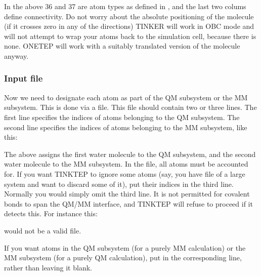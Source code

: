 \documentclass[letterpaper,10pt,english]{sphinxmanual}
\begin{document}
In the above 36 and 37 are atom types as defined in ,
and the last two colums define connectivity. Do not worry about the
absolute positioning of the molecule (if it crosses zero in any of the
directions) \textendash{} TINKER will work in OBC mode and will not attempt to wrap
your atoms back to the simulation cell, because there is none. ONETEP
will work with a suitably translated version of the molecule anyway.


\subsubsection{Input  file}
\label{\detokenize{tinktep:input-tag-file}}
Now we need to designate each atom as part of the QM subsystem or the MM
subsystem. This is done via a  file. This file should contain
two or three lines. The first line specifies the indices of atoms
belonging to the QM subsystem. The second line specifies the indices of
atoms belonging to the MM subsystem, like this:

%
\begin{sphinxVerbatim}[commandchars=\\\{\}]
  
  
\end{sphinxVerbatim}

The above assigns the first water molecule to the QM subsystem, and the
second water molecule to the MM subsystem. In the  file, all
atoms must be accounted for. If you want TINKTEP to ignore some atoms
(say, you have  file of a large system and want to discard some
of it), put their indices in the third line. Normally you would simply
omit the third line. It is not permitted for covalent bonds to span the
QM/MM interface, and TINKTEP will refuse to proceed if it detects this.
For instance this:

%
\begin{sphinxVerbatim}[commandchars=\\\{\}]
 
   
\end{sphinxVerbatim}

would not be a valid  file.

If you want  atoms in the QM subsystem (for a purely MM calculation)
or the MM subsystem (for a purely QM calculation), put  in the
corresponding line, rather than leaving it blank.
\end{document}

